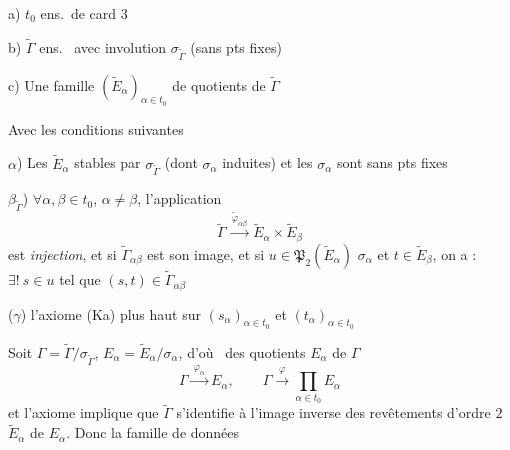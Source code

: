 \documentclass[11pt,a4paper]{article}
\begin{document}

a) $t_0$ ens.\ de card $3$

b) $\widetilde{\Gamma}$ ens.\ \add{$\neq\emptyset$} avec involution
$\sigma_{\widetilde{\Gamma}}$ (sans pts fixes)

c) Une famille $(\widetilde{E}_\alpha)_{\alpha\in t_0}$ de quotients de
$\widetilde{\Gamma}$ 

Avec les conditions suivantes

$\alpha$) Les $\widetilde{E}_\alpha$ stables par $\sigma_{\widetilde{\Gamma}}$
(dont $\sigma_\alpha$ induites) et les $\sigma_\alpha$ sont sans pts fixes

$\beta_{\widetilde{\Gamma}}$)  $\forall\alpha,\beta\in t_0$,
$\alpha\neq\beta$, l'application
\[
  \widetilde{\Gamma}\xrightarrow{\ \widetilde{\varphi}_{\alpha\beta}\ }
  \widetilde{E}_\alpha\times\widetilde{E}_\beta
\]
est \emph{injection}, et si $\widetilde{\Gamma}_{\alpha\beta}$ est son image,
 et si  $u\in\mathfrak{P}_2(\widetilde{E}_\alpha)$   $\sigma_\alpha$  et
$t\in\widetilde{E}_\beta$, on a : $\exists!\ s\in u$ tel que
$(s,t)\in\widetilde{\Gamma}_{\alpha\beta}$

($\gamma$)  l'axiome (Ka) plus haut sur $(s_\alpha)_{\alpha\in t_0}$
et $(t_\alpha)_{\alpha\in t_0}$


Soit $\Gamma=\widetilde{\Gamma}/\sigma_{\widetilde{\Gamma}}$,
$E_\alpha=\widetilde{E}_\alpha/\sigma_\alpha$, d'où \ des quotients
$E_\alpha$ de $\Gamma$
\[
  \Gamma\xrightarrow{\ \varphi_\alpha\ }E_\alpha ,\qquad
  \Gamma\xrightarrow{\ \varphi\ }\prod_{\alpha\in t_0}E_\alpha
\]
et l'axiome  implique que \add{$\forall\alpha$,} $\widetilde{\Gamma}$
s'identifie à l'image inverse des revêtements d'ordre $2$ $\widetilde{E}_\alpha$ de
$E_\alpha$. Donc la famille de données
\end{document}
